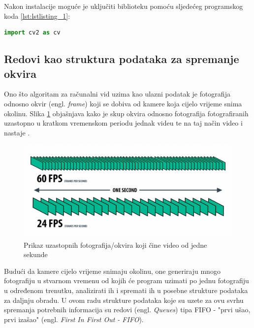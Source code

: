 \documentclass{foi}
\begin{document}
Nakon instalacije moguće je uključiti biblioteku pomoću sljedećeg programskog koda \ref{lst:lstlisting_1}:
\begin{lstlisting}[language=Python, label={lst:lstlisting_1}, firstnumber=1, style=colored, caption=Uključivanje biblioteke $OpenCV$]
import cv2 as cv
\end{lstlisting}

\justifying

\subsection{Redovi kao struktura podataka za spremanje okvira}

Ono što algoritam za računalni vid uzima kao ulazni podatak je fotografija odnosno okvir (engl. \emph{frame}) koji se dobiva od kamere koja cijelo vrijeme snima okolinu. Slika \ref{fig:slika_frame} objašnjava kako je skup okvira odnosno fotografija fotografiranih uzastopno u kratkom vremenskom periodu jednak videu te na taj način video i nastaje \cite{AnimoticaBlog2020}.

\begin{figure}[h!]
    \centering
    \includegraphics[width=1\textwidth]{slike/frames-per-second-diagram}
    \caption{Prikaz uzastopnih fotografija/okvira koji čine video od jedne sekunde \cite{AnimoticaBlog2020}}
    \label{fig:slika_frame}
\end{figure}

Budući da kamere cijelo vrijeme snimaju okolinu, one generiraju mnogo fotografiju u stvarnom vremenu od kojih će program uzimati po jednu fotografiju u određenom trenutku, analizirati ih i spremati ih u posebne strukture podataka za daljnju obradu. U ovom radu strukture podataka koje su uzete za ovu svrhu spremanja potrebnih informacija su redovi (engl. \emph{Queues}) tipa FIFO - "prvi ušao, prvi izašao" (engl. \emph{First In First Out - FIFO}).
\end{document}
